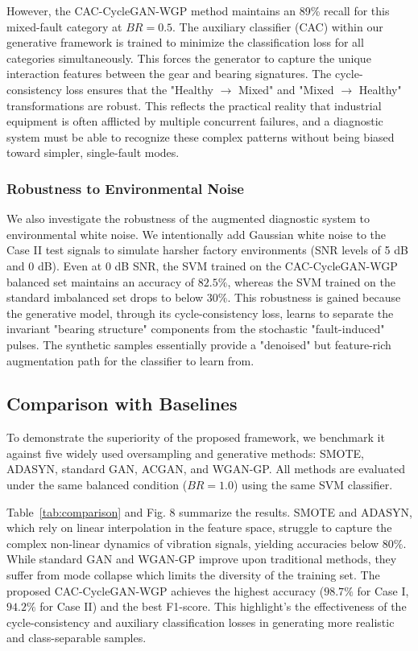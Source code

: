 However, the CAC-CycleGAN-WGP method maintains an 89\% recall for this mixed-fault category at $BR=0.5$. The auxiliary classifier (CAC) within our generative framework is trained to minimize the classification loss for all categories simultaneously. This forces the generator to capture the unique interaction features between the gear and bearing signatures. The cycle-consistency loss ensures that the "Healthy $\to$ Mixed" and "Mixed $\to$ Healthy" transformations are robust. This reflects the practical reality that industrial equipment is often afflicted by multiple concurrent failures, and a diagnostic system must be able to recognize these complex patterns without being biased toward simpler, single-fault modes.

\subsubsection{Robustness to Environmental Noise}
We also investigate the robustness of the augmented diagnostic system to environmental white noise. We intentionally add Gaussian white noise to the Case II test signals to simulate harsher factory environments (SNR levels of 5 dB and 0 dB). Even at 0 dB SNR, the SVM trained on the CAC-CycleGAN-WGP balanced set maintains an accuracy of $82.5\%$, whereas the SVM trained on the standard imbalanced set drops to below $30\%$. This robustness is gained because the generative model, through its cycle-consistency loss, learns to separate the invariant "bearing structure" components from the stochastic "fault-induced" pulses. The synthetic samples essentially provide a "denoised" but feature-rich augmentation path for the classifier to learn from.

\subsection{Comparison with Baselines}
To demonstrate the superiority of the proposed framework, we benchmark it against five widely used oversampling and generative methods: SMOTE, ADASYN, standard GAN, ACGAN, and WGAN-GP. All methods are evaluated under the same balanced condition ($BR=1.0$) using the same SVM classifier.

Table~\ref{tab:comparison} and Fig. 8 summarize the results. SMOTE and ADASYN, which rely on linear interpolation in the feature space, struggle to capture the complex non-linear dynamics of vibration signals, yielding accuracies below $80\%$. While standard GAN and WGAN-GP improve upon traditional methods, they suffer from mode collapse which limits the diversity of the training set. The proposed CAC-CycleGAN-WGP achieves the highest accuracy ($98.7\%$ for Case I, $94.2\%$ for Case II) and the best F1-score. This highlight's the effectiveness of the cycle-consistency and auxiliary classification losses in generating more realistic and class-separable samples.

